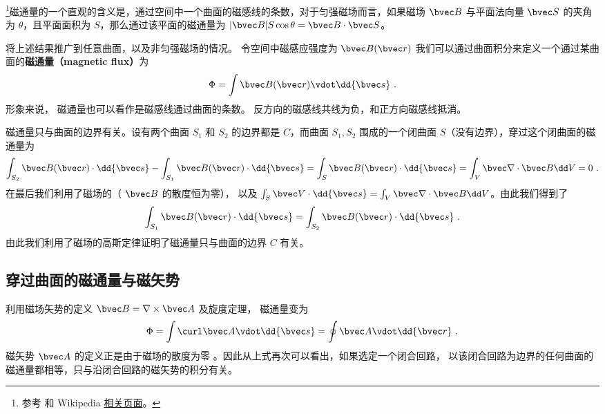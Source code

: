 
\begin{issues}
\issueDraft
{}
\end{issues}


\footnote{参考 \cite{GriffE} 和 Wikipedia \href{https://en.wikipedia.org/wiki/Magnetic_flux}{相关页面}。}磁通量的一个直观的含义是，通过空间中一个曲面的磁感线的条数，对于匀强磁场而言，如果磁场 $\bvec B$ 与平面法向量 $\bvec S$ 的夹角为 $\theta$，且平面面积为 $S$，那么通过该平面的磁通量为 $|\bvec B|S \cos\theta = \bvec B\cdot \bvec S$。

将上述结果推广到任意曲面，以及非匀强磁场的情况。
令空间中磁感应强度为 $\bvec B(\bvec r)$ 我们可以通过曲面积分来定义一个通过某曲面的\textbf{磁通量（magnetic flux）}为
\begin{equation}
\Phi  = \int \bvec B(\bvec r) \vdot \dd{\bvec s}~.
\end{equation}
形象来说， 磁通量也可以看作是磁感线通过曲面的条数。 反方向的磁感线共线为负，和正方向磁感线抵消。

磁通量只与曲面的边界有关。设有两个曲面 $S_1$ 和 $S_2$ 的边界都是 $C$，而曲面 $S_1,S_2$ 围成的一个闭曲面 $S$（没有边界），穿过这个闭曲面的磁通量为
\begin{equation}
\int_{S_2} \bvec B(\bvec r)\cdot \dd {\bvec s }- \int_{S_1} \bvec B(\bvec r)\cdot \dd {\bvec s} = \int_{S} \bvec B(\bvec r)\cdot \dd {\bvec s}=\int_V \bvec \nabla \cdot \bvec B \dd V=0~.
\end{equation}
在最后我们利用了磁场的（ $\bvec B$ 的散度恒为零）， 以及 $\int_S \bvec V\cdot \dd{\bvec s}=\int_V \bvec \nabla\cdot \bvec B \dd V$。由此我们得到了
\begin{equation}
\int_{S_1} \bvec B(\bvec r)\cdot \dd {\bvec s}
=
\int_{S_2} \bvec B(\bvec r)\cdot \dd {\bvec s }~.
\end{equation}
由此我们利用了磁场的高斯定律证明了磁通量只与曲面的边界 $C$ 有关。
\subsection{穿过曲面的磁通量与磁矢势}
利用磁场矢势的定义 $\bvec B=\nabla\times \bvec A$ %
及旋度定理， %
磁通量变为
\begin{equation} \label{eq_BFlux_2}
\Phi  = \int \curl \bvec A \vdot \dd{\bvec s}  = \oint \bvec A \vdot \dd{\bvec r}~.
\end{equation}
磁矢势 $\bvec A$ 的定义正是由于磁场的散度为零%
。因此从上式再次可以看出，如果选定一个闭合回路， 以该闭合回路为边界的任何曲面的磁通量都相等，只与沿闭合回路的磁矢势的积分有关。
